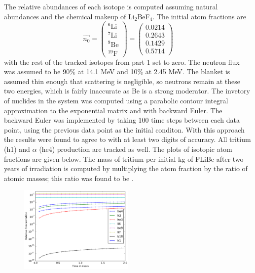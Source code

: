 \documentclass[12pt]{article}
\newenvironment{solnum}[2][Solution]{\begin{trivlist}
\item[\hskip \labelsep {\bfseries #1}\hskip \labelsep {\bfseries #2:}]\hspace{0.3in}\newline\newline}{\end{trivlist}}
\begin{document}
\begin{solnum}{1-2}

    The relative abundances of each isotope is computed assuming natural abundances and the
    chemical makeup of Li$_2$BeF$_4$.  The initial atom fractions are
    \begin{equation}
        \vec{n_0} =  \begin{pmatrix}
            ^{6}\text{Li} \\
            ^{7}\text{Li}\\ 
            ^{9} \text{Be}\\ 
            ^{19}\text{F}
        \end{pmatrix} = 
     \begin{pmatrix}
            0.0214   \\
            0.2643   \\ 
            0.1429    \\ 
            0.5714 
        \end{pmatrix} 
    \end{equation} 
    with the rest of the tracked isotopes from part 1 set to zero. 
    The neutron flux was assumed to be 90\% at 14.1 MeV and 10\% at 2.45 MeV.
    The blanket is assumed thin enough that scattering is negligible, so neutrons
    remain at these two energies, which is fairly inaccurate as Be is a strong
    moderator.
    The invetory of nuclides in the system was computed using a parabolic contour integral
    approximation to the exponential matrix and with backward Euler.  The backward Euler was implemented by taking 100 time steps
    between each data point, using the previous data point as the initial conditon.  With this approach the results were found to agree to
    with at least two digits of accuracy.  All tritium (h1) and $\alpha$ (he4)
    production are tracked as well. The plots of isotopic atom fractions are given
    below.  The mass of tritium per initial kg of FLiBe after two years of
    irradiation is computed by multiplying the atom fraction by the ratio of atomic
    masses; this ratio was found to be .
    \begin{figure}
        \centering
        \includegraphics[width=0.5\textwidth]{p1.pdf}

\end{figure}
\end{solnum}
\end{document}
